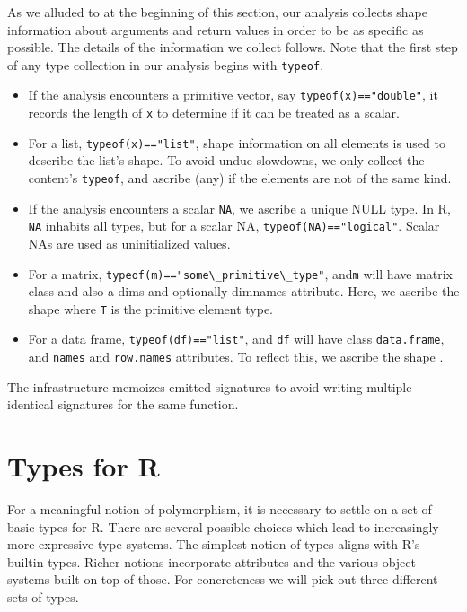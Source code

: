 \documentclass[acmsmall,10pt,review,anonymous]{acmart}\settopmatter{printfolios=true,printccs=false,printacmref=false}
\newcommand{\code}[1]{\lstinline|#1|\xspace}
\begin{document}
As we alluded to at the beginning of this section, our analysis collects shape information about
arguments and return values in order to be as specific as possible. The details of the information we collect follows.
Note that the first step of any type collection in our analysis begins with \code{typeof}.

\begin{itemize}
\item If the analysis encounters a primitive vector, say
  \code{typeof(x)=="double"}, it records the length of {\tt x} to determine
  if it can be treated as a scalar.
\item For a list, \code{typeof(x)=="list"}, shape information on all
  elements is used to describe the list's shape.  To avoid undue slowdowns,
  we only collect the content's \code{typeof}, and ascribe \ANY (any) if the
  elements are not of the same kind.
\item If the analysis encounters a scalar \code{NA}, we ascribe a unique
  NULL type.  In R, \code{NA} inhabits all types, but for a scalar NA,
  \code{typeof(NA)=="logical"}. Scalar NAs are used as uninitialized values.
\item For a matrix, \code{typeof(m)=="some\_primitive\_type"}, and\code{m} will have matrix class and also a dims and
  optionally dimnames attribute. Here, we ascribe the shape 
  where {\tt T} is the primitive element type.
\item For a data frame, \code{typeof(df)=="list"}, and \code{df} will have class {\tt data.frame}, and {\tt names} and {\tt row.names} attributes.
 To reflect this, we ascribe the shape .
\end{itemize}

The infrastructure memoizes emitted signatures to avoid writing multiple
identical signatures for the same function.

\section{Types for R}

For a meaningful notion of polymorphism, it is necessary to settle on a set
of basic types for R. There are several possible choices which lead to
increasingly more expressive type systems. The simplest notion of types
aligns with R's builtin types. Richer notions incorporate attributes and
the various object systems built on top of those. For concreteness we will
pick out three different sets of types.
\end{document}
